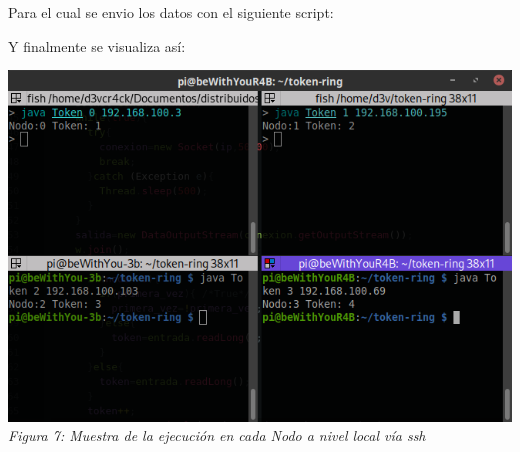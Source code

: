 \documentclass[10pt,executivepaper]{article}
\begin{document}
Para el cual se envio los datos con el siguiente script:
\begin{center}
  
\end{center}
Y finalmente se visualiza así:
\begin{center}
  \includegraphics[scale=0.5]{img/token-2.png}
  \\\textit{Figura 7: Muestra de la ejecución en cada Nodo a nivel local vía ssh}
\end{center}
\end{document}
